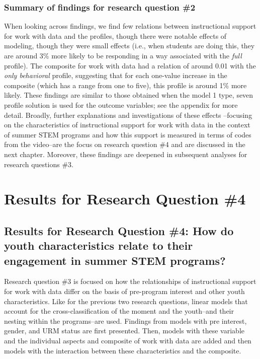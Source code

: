 \documentclass[]{msu-thesis}
\theoremstyle{definition}
\theoremstyle{definition}
\theoremstyle{definition}
\theoremstyle{remark}
\begin{document}
\subsection{Summary of findings for research question
\#2}\label{summary-of-findings-for-research-question-2}

When looking across findings, we find few relations between
instructional support for work with data and the profiles, though there
were notable effects of modeling, though they were small effects (i.e.,
when students are doing this, they are around 3\% more likely to be
responding in a way associated with the \emph{full} profile). The
composite for work with data had a relation of around 0.01 with the
\emph{only behavioral} profile, suggesting that for each one-value
increase in the composite (which has a range from one to five), this
profile is around 1\% more likely. These findings are similar to those
obtained when the model 1 type, seven profile solution is used for the
outcome variables; see the appendix for more detail. Broadly, further
explanations and investigations of these effects --focusing on the
characteristics of instructional support for work with data in the
context of summer STEM programs and how this support is measured in
terms of codes from the video--are the focus on research question \#4
and are discussed in the next chapter. Moreover, these findings are
deepened in subsequent analyses for research questions \#3.

\chapter{Results for Research Question
\#4}\label{results-for-research-question-4}

\section{Results for Research Question \#4: How do youth characteristics
relate to their engagement in summer STEM
programs?}\label{results-for-research-question-4-how-do-youth-characteristics-relate-to-their-engagement-in-summer-stem-programs}

Research question \#3 is focused on how the relationships of
instructional support for work with data differ on the basis of
pre-program interest and other youth characteristics. Like for the
previous two research questions, linear models that account for the
cross-classification of the moment and the youth--and their nesting
within the programs--are used. Findings from models with pre interest,
gender, and URM status are first presented. Then, models with these
variable and the individual aspects and composite of work with data are
added and then models with the interaction between these characteristics
and the composite.
\end{document}
